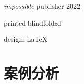 \documentclass{book}        %
\date{}
\begin{document}


\begin{titlepage}\thispagestyle{empty} \vspace*{3em}
\clearpage\newpage \thispagestyle{empty} \mbox{} \cleardoublepage

\thispagestyle{empty} \cleardoublepage

\thispagestyle{empty} \vspace*{\fill} \parbox{.8\textwidth}{\raggedright \scriptsize
\textit{impossible} publisher 2022

printed blindfolded

design: \LaTeX
}
\end{titlepage}
\clearpage \thispagestyle{empty}\cleardoublepage
\newpage %


\tableofcontents %















\part{案例分析}
\end{document}
